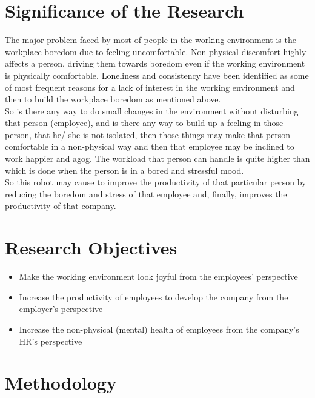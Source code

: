 \documentclass{article}
\begin{document}
	\section{Significance of the Research}
	The major problem faced by most of people in the working environment is the workplace boredom due to feeling uncomfortable. Non-physical discomfort highly affects a person, driving them towards boredom\cite{whyYouFeelBored} even if the working environment is physically comfortable. Loneliness and consistency have been identified as some of most frequent reasons for a lack of interest in the working environment and then to build the workplace boredom as mentioned above.\\

	\indent So is there any way to do small changes in the environment without disturbing that person (employee), and is there any way to build up a feeling in those person, that he/ she is not isolated, then those things may make that person comfortable in a non-physical way and then that employee may be inclined to work happier and agog\cite{happynessAndProductivity}. The workload that person can handle is quite higher than which is done when the person is in a bored and stressful mood.\\
	
	\indent So this robot may cause to improve the productivity of that particular person by reducing the boredom and stress of that employee and, finally, improves the productivity of that company.
	
	\section{Research Objectives}
	\begin{itemize}
		\item Make the working environment look joyful from the employees’ perspective
		\item Increase the productivity of employees to develop the company from the employer’s perspective
		\item Increase the non-physical (mental) health of employees from the company's HR’s perspective
	\end{itemize}

	\section{Methodology}
\end{document}
